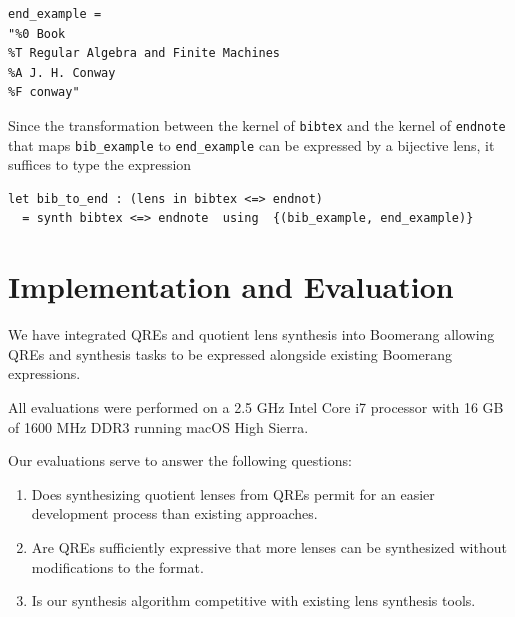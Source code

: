 \documentclass{svproc}
\newcommand{\cd}[1]{\lstinline[backgroundcolor=\color{white}]$#1$}
\begin{document}
\begin{lstlisting}
end_example = 
"%0 Book
%T Regular Algebra and Finite Machines
%A J. H. Conway
%F conway"
\end{lstlisting}

Since the transformation between the kernel of \cd{bibtex} and the kernel of
\cd{endnote} that maps \cd{bib_example} to \cd{end_example} can be
expressed by a bijective lens, it suffices to type the expression

\begin{lstlisting}
let bib_to_end : (lens in bibtex <=> endnot) 
  = synth bibtex <=> endnote  using  {(bib_example, end_example)}
\end{lstlisting}

\section{Implementation and Evaluation}
\label{impl}


We have integrated QREs and quotient lens synthesis into Boomerang allowing QREs
and synthesis tasks to be expressed alongside existing Boomerang expressions.

All evaluations were performed on a 2.5 GHz Intel Core i7 processor with 16 GB
of 1600 MHz DDR3 running macOS High Sierra.

Our evaluations serve to answer the following questions:
\begin{enumerate}
\item Does synthesizing quotient lenses from QREs permit for an easier
  development process than existing approaches.

\item Are QREs sufficiently expressive that more lenses can be synthesized
  without modifications to the format. 

\item Is our synthesis algorithm competitive with existing lens synthesis
  tools.
\end{enumerate}
\end{document}
